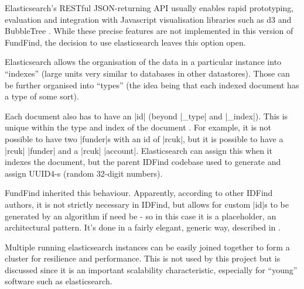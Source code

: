  
 Elasticsearch's RESTful JSON-returning API usually enables rapid prototyping, evaluation and integration with Javascript visualisation libraries such as d3 \cite{d3} and BubbleTree \cite{bubbletree}. While these precise features are not implemented in this version of FundFind, the decision to use elasticsearch leaves this option open.
 
 Elasticsearch allows the organisation of the data in a particular instance into ``indexes'' (large units very similar to databases in other datastores). Those can be further organised into ``types'' (the idea being that each indexed document has a type of some sort).
 
 Each document also has to have an |id| (beyond |_type| and |_index|). This is unique within the type and index of the document \cite{es-uid-field}. For example, it is not possible to have two |funder|s with an id of |rcuk|, but it is possible to have a |rcuk| |funder| and a |rcuk| |account|.  Elasticsearch can assign this when it indexes the document, but the parent IDFind codebase used to generate and assign UUID4-s (random 32-digit numbers).
 
 FundFind inherited this behaviour. Apparently, according to other IDFind authors, it is not strictly necessary in IDFind, but allows for custom |id|s to be generated by an algorithm if need be - so in this case it is a placeholder, an architectural pattern. It's done in a fairly elegant, generic way, described in .
 
 Multiple running elasticsearch instances can be easily joined together to form a cluster for resilience and performance. This is not used by this project but is discussed since it is an important scalability characteristic, especially for ``young'' software such as elasticsearch.
 
 
